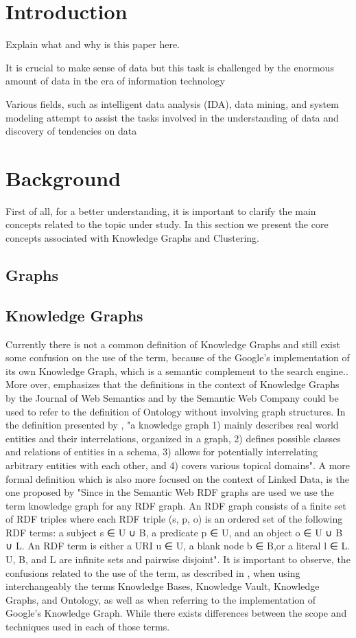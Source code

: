 \documentclass[runningheads]{llncs}
\begin{document}
\section{Introduction}
Explain what and why is this paper here.

It is crucial to make sense of data but this task is challenged by the enormous amount of data in the era of information technology \cite{Pedrycz}

Various fields, such as intelligent data analysis (IDA), data mining, and system modeling attempt to assist the tasks involved in the understanding of data and discovery of tendencies on data \cite{Pedrycz}


\section{Background}
First of all, for a better understanding, it is important to clarify the main concepts related to the topic under study. In this section we present the core concepts associated with Knowledge Graphs and Clustering.
\subsection{Graphs}
\subsection{Knowledge Graphs}
Currently there is not a common definition of Knowledge Graphs and still exist some confusion on the use of the term, because of the Google's implementation of its own Knowledge Graph, which is a semantic complement to the search engine.\cite{Ehrlinger}. More over, \cite{Ehrlinger} emphasizes that the definitions in the context of Knowledge Graphs by the Journal of Web Semantics and by the Semantic Web Company could be used to refer to the definition of Ontology without involving graph structures. 
In the definition presented by \cite{Paulheim}, "a knowledge graph
1) mainly describes real world entities and their interrelations, organized in a graph, 2) defines possible classes and relations of entities in a schema, 3) allows for potentially interrelating arbitrary entities with each other, and 4) covers various topical domains". A more formal definition which is also more focused on the context of Linked Data, is the one proposed by \cite{Farber} "Since in the Semantic Web RDF graphs are used we use the term knowledge graph for any RDF graph. An RDF graph consists of a finite set of RDF triples where each RDF triple (s, p, o) is an ordered set of the following RDF terms: a subject s ∈ U ∪ B, a predicate p ∈ U, and an object o ∈ U ∪ B ∪ L. An RDF term is either a URI u ∈ U, a blank node b ∈ B,or a literal l ∈ L. U, B, and L are infinite sets and pairwise disjoint".
It is important to observe, the confusions related to the use of the term, as described in \cite{Ehrlinger}, when using interchangeably the terms Knowledge Bases, Knowledge Vault, Knowledge Graphs, and Ontology, as well as when referring to the implementation of Google’s Knowledge Graph. While there exists differences between the scope and techniques used in each of those terms.
\end{document}
